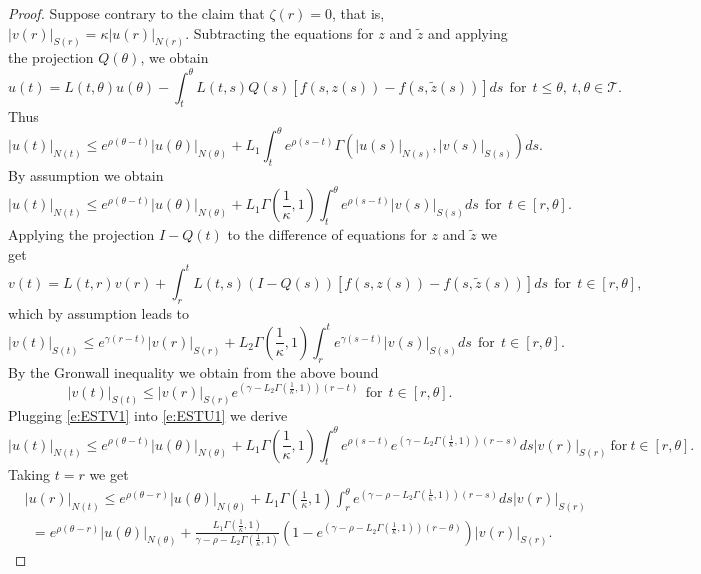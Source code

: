 \documentclass[a4paper,11pt,reqno]{amsart}
\theoremstyle{plain}
\theoremstyle{definition}
\numberwithin{equation}{section}
\newcommand{\calt}{\mathcal T}
\renewcommand{\leq}{\leqslant}
\begin{document}
\begin{proof}
Suppose contrary to the claim that $\zeta(r)=0$, that is, $|v(r)|_{S(r)}=\kappa |u(r)|_{N(r)}$. Subtracting the equations for $z$ and $\tilde z$ and applying the projection $Q(\theta)$,  we obtain
$$u(t)=L(t,\theta)u(\theta)-\int_{t}^{\theta}L(t,s)Q(s)[f(s,z(s))-f(s,\tilde z(s))]ds\ \ \textrm{for}\ \ t\leq\theta,\ t,\theta\in\calt.$$
Thus
$$|u(t)|_{N(t)}\leq e^{\rho(\theta-t)}|u(\theta)|_{N(\theta)}+L_1\int_{t}^{\theta}e^{\rho(s-t)}\Gamma(|u(s)|_{N(s)},|v(s)|_{S(s)})ds .$$
By assumption we obtain
\begin{equation}\label{e:ESTU1}
|u(t)|_{N(t)}\leq  e^{\rho(\theta-t)}|u(\theta)|_{N(\theta)}+L_1\Gamma\left(\frac{1}{\kappa},1\right)\int_{t}^{\theta}e^{\rho(s-t)}|v(s)|_{S(s)}ds\ \ \text{for}\ \ t\in [r,\theta].
\end{equation}
Applying the projection $I-Q(t)$ to the difference of equations for $z$ and $\tilde z$ we get
$$v(t)=L(t,r)v(r)+\int_{r}^{t}L(t,s)(I-Q(s))[f(s,z(s))-f(s,\tilde z(s))]ds\ \ \text{for}\ \ t\in [r,\theta],$$
which by assumption leads to
\begin{equation}\label{e:secondbound}
	|v(t)|_{S(t)}\leq e^{\gamma(r-t)}|v(r)|_{S(r)}+L_2\Gamma\left(\frac{1}{\kappa},1\right)\int_{r}^{t}e^{\gamma(s-t)}|v(s)|_{S(s)}ds\ \ \text{for}\ \ t\in [r,\theta].
	\end{equation}
By the Gronwall inequality we obtain from the  above  bound
\begin{equation}\label{e:ESTV1}
|v(t)|_{S(t)}\leq |v(r)|_{S(r)}e^{\left(\gamma-L_2\Gamma\left(\frac{1}{\kappa},1\right)\right)(r-t)}\ \ \text{for}\ \ t\in [r,\theta].
\end{equation}
Plugging \eqref{e:ESTV1} into \eqref{e:ESTU1} we derive
$$|u(t)|_{N(t)}\leq e^{\rho(\theta-t)}|u(\theta)|_{N(\theta)}+L_1\Gamma\left(\frac{1}{\kappa},1\right)\int_{t}^{\theta}e^{\rho(s-t)}e^{\left(\gamma-L_2\Gamma\left(\frac{1}{\kappa},1\right)\right)(r-s)}ds|v(r)|_{S(r)}\ \text{for}\ t\in[r,\theta].$$
Taking $t=r$ we get
\begin{align*}
	&|u(r)|_{N(t)}\leq e^{\rho(\theta-r)}|u(\theta)|_{N(\theta)}+L_1\Gamma\left(\frac{1}{\kappa},1\right)\int_{r}^{\theta}e^{\left(\gamma-\rho-L_2\Gamma\left(\frac{1}{\kappa},1\right)\right)(r-s)}ds|v(r)|_{S(r)}\\
	& \ \ =e^{\rho(\theta-r)}|u(\theta)|_{N(\theta)}+\frac{L_1\Gamma\left(\frac{1}{\kappa},1\right)}{\gamma-\rho-L_2\Gamma\left(\frac{1}{\kappa},1\right)}\left(1-e^{\left(\gamma-\rho-L_2\Gamma\left(\frac{1}{\kappa},1\right)\right)(r-\theta)}\right)|v(r)|_{S(r)}.

\end{align*}
\end{proof}
\end{document}
